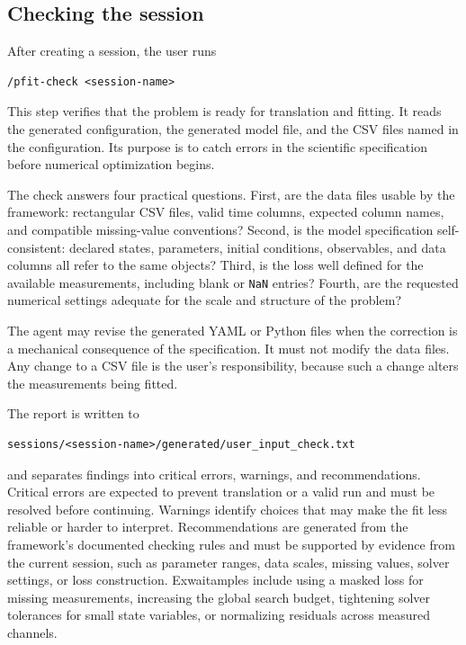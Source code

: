 \subsection{Checking the session}
\label{sec:pfit-check}

After creating a session, the user runs

\begin{verbatim}
/pfit-check <session-name>
\end{verbatim}

This step verifies that the problem is ready for translation and fitting. It
reads the generated configuration, the generated model file, and the CSV files
named in the configuration. Its purpose is to catch errors in the scientific
specification before numerical optimization begins.

The check answers four practical questions. First, are the data files usable by
the framework: rectangular CSV files, valid time columns, expected column names,
and compatible missing-value conventions? Second, is the model specification
self-consistent: declared states, parameters, initial conditions, observables,
and data columns all refer to the same objects? Third, is the loss well defined
for the available measurements, including blank or \texttt{NaN} entries? Fourth,
are the requested numerical settings adequate for the scale and structure of
the problem?

The agent may revise the generated YAML or Python files when the correction is
a mechanical consequence of the specification. It must not modify the data
files. Any change to a CSV file is the user's responsibility, because such a
change alters the measurements being fitted.

The report is written to

\begin{verbatim}
sessions/<session-name>/generated/user_input_check.txt
\end{verbatim}

and separates findings into critical errors, warnings, and recommendations.
Critical errors are expected to prevent translation or a valid run and must be
resolved before continuing. Warnings identify choices that may make the fit less
reliable or harder to interpret. Recommendations are generated from the
framework's documented checking rules and must be supported by evidence from
the current session, such as parameter ranges, data scales, missing values,
solver settings, or loss construction. Exwaitamples include using a masked loss for
missing measurements, increasing the global search budget, tightening solver
tolerances for small state variables, or normalizing residuals across measured
channels.

